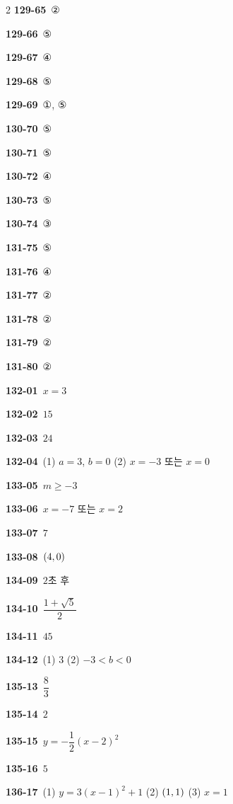 \documentclass[10pt,a4paper]{article}
\begin{document}
\begin{multicols}{2}
\noindent\textbf{129-65}\ ②\par
\noindent\textbf{129-66}\ ⑤\par
\noindent\textbf{129-67}\ ④\par
\noindent\textbf{129-68}\ ⑤\par
\noindent\textbf{129-69}\ ①, ⑤\par
\noindent\textbf{130-70}\ ⑤\par
\noindent\textbf{130-71}\ ⑤\par
\noindent\textbf{130-72}\ ④\par
\noindent\textbf{130-73}\ ⑤\par
\noindent\textbf{130-74}\ ③\par
\noindent\textbf{131-75}\ ⑤\par
\noindent\textbf{131-76}\ ④\par
\noindent\textbf{131-77}\ ②\par
\noindent\textbf{131-78}\ ②\par
\noindent\textbf{131-79}\ ②\par
\noindent\textbf{131-80}\ ②\par
\noindent\textbf{132-01}\ $x=3$\par
\noindent\textbf{132-02}\ $15$\par
\noindent\textbf{132-03}\ $24$\par
\noindent\textbf{132-04}\ (1) $a=3$, $b=0$ (2) $x=-3$ 또는 $x=0$\par
\noindent\textbf{133-05}\ $m\ge -3$\par
\noindent\textbf{133-06}\ $x=-7$ 또는 $x=2$\par
\noindent\textbf{133-07}\ $7$\par
\noindent\textbf{133-08}\ $(4{,}\mkern3mu 0)$\par
\noindent\textbf{134-09}\ $2$초 후\par
\noindent\textbf{134-10}\ $\dfrac{1+\sqrt{5}}{2}$\par
\noindent\textbf{134-11}\ $45$\par
\noindent\textbf{134-12}\ (1) $3$ (2) $-3<b<0$\par
\noindent\textbf{135-13}\ $\dfrac{8}{3}$\par
\noindent\textbf{135-14}\ $2$\par
\noindent\textbf{135-15}\ $y=-\dfrac{1}{2}(x-2)^2$\par
\noindent\textbf{135-16}\ $5$\par
\noindent\textbf{136-17}\ (1) $y=3(x-1)^2+1$ (2) $(1{,}\mkern3mu 1)$ (3) $x=1$\par

\end{multicols}
\end{document}
